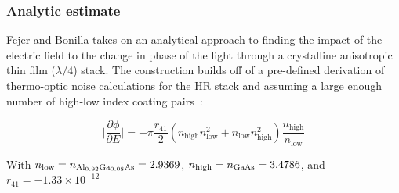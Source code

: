 %


\subsubsection*{Analytic estimate}
Fejer and Bonilla takes on an analytical approach to finding the impact of the electric field to the change in phase of the light through a crystalline anisotropic thin film ($\lambda/4$) stack. The construction builds off of a pre-defined derivation of thermo-optic noise calculations for the HR stack and assuming a large enough number of high-low index coating pairs~\cite{bonillafejer, fejer_estimate}:

\begin{equation}
    \bigg| \frac{\partial \phi}{\partial E} \bigg| = - \pi \frac{r_{41}}{2}(n_\mathrm{high} n_\mathrm{low} ^2 + n_\mathrm{low} n_\mathrm{high} ^2) \frac{n_\mathrm{high}}{n_\mathrm{low}}
\end{equation}

With $n_\mathrm{low} = n_{\mathrm{Al_{0.92}Ga_{0.08}As}} = 2.9369$, $n_\mathrm{high} = n_{\mathrm{GaAs}} = 3.4786$, and $r_{41} = -1.33 \times 10^{-12}$

